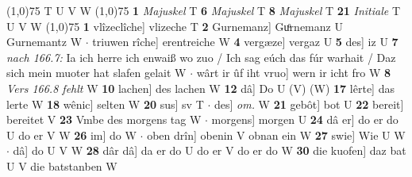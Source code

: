 \documentclass[8pt,a4paper,notitlepage]{article}
\begin{document}
\begin{table}[ht]
\begin{minipage}[t]{0.5\linewidth}
\begin{tabular}{rl}
\end{tabular}
\scriptsize
\line(1,0){75} \newline
T U V W \newline
\line(1,0){75} \newline
\textbf{1} \textit{Majuskel} T  \textbf{6} \textit{Majuskel} T  \textbf{8} \textit{Majuskel} T  \textbf{21} \textit{Initiale} T U V W  \newline
\line(1,0){75} \newline
\textbf{1} vlîzeclîche] vlizeche T \textbf{2} Gurnemanz] Guͦrnemanz U Gurnemantz W  $\cdot$ triuwen rîche] erentreiche W \textbf{4} vergæze] vergaz U \textbf{5} des] iz U \textbf{7} \textit{nach 166.7:} Ia ich herre ich enwaiß wo zuo / Ich sag eúch das fúr warhait / Daz sich mein muoter hat slafen gelait W   $\cdot$ wârt ir ûf iht vruo] wern ir icht fro W \textbf{8} \textit{Vers 166.8 fehlt} W  \textbf{10} lachen] des lachen W \textbf{12} dâ] Do U (V) (W) \textbf{17} lêrte] das lerte W \textbf{18} wênic] selten W \textbf{20} sus] sv T  $\cdot$ des] \textit{om.} W \textbf{21} gebôt] bot U \textbf{22} bereit] bereitet V \textbf{23} Vmbe des morgens tag W  $\cdot$ morgens] morgen U \textbf{24} dâ er] do er do U do er V W \textbf{26} im] do W  $\cdot$ oben drîn] obenin V obnan ein W \textbf{27} swie] Wie U W  $\cdot$ dâ] do U V W \textbf{28} dâr dâ] da er do U do er V do er do W \textbf{30} die kuofen] daz bat U V die batstanben W \newline
\end{minipage}
\end{table}
\end{document}
